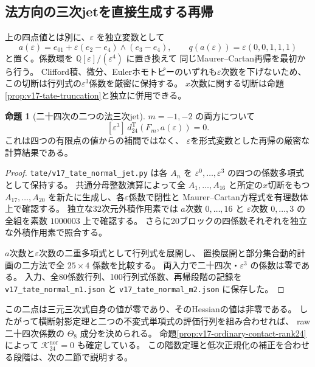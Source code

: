 \documentclass[a4paper,11pt]{ltjsarticle}
\theoremstyle{definition}
\newtheorem{proposition}[theorem]{命題}
\begin{document}
\subsection{法方向の三次jetを直接生成する再帰}
\label{subsec:v17-tate-normal-jets}
上の四点値とは別に、$\varepsilon$ を独立変数として
\[
 a(\varepsilon)=e_{01}+\varepsilon(e_2-e_4)\wedge(e_3-e_4),
 \qquad q(a(\varepsilon))=\varepsilon(0,0,1,1,1)
\]
と置く。係数環を $\mathbb Q[\varepsilon]/(\varepsilon^4)$ に置き換えて
同じMaurer--Cartan再帰を最初から行う。
Clifford積、微分、Eulerホモトピーのいずれも$\varepsilon$次数を下げないため、
この切断は行列式の$\varepsilon^3$係数を厳密に保持する。
$x$次数に関する切断は命題\ref{prop:v17-tate-truncation}と独立に併用できる。

\begin{proposition}[二十四次の二つの法三次jet]
\label{prop:v17-tate24-normal-jets}
$m=-1,-2$ の両方について
\[
 [\varepsilon^3]\,d_{24}^{\mathrm T}(F_m,a(\varepsilon))=0.
\]
これは四つの有限点の値からの補間ではなく、
$\varepsilon$を形式変数とした再帰の厳密な計算結果である。
\end{proposition}
\begin{proof}
\nolinkurl{tate/v17_tate_normal_jet.py} は各 $A_n$ を
$\varepsilon^0,\ldots,\varepsilon^3$ の四つの係数多項式として保持する。
共通分母整数演算によって全 $A_1,\ldots,A_{16}$ と所定の$x$切断をもつ
$A_{17},\ldots,A_{20}$ を新たに生成し、各$\varepsilon$係数で閉性と
Maurer--Cartan方程式を有理数体上で確認する。
独立な32次元外積作用素では $a$次数 $0,\ldots,16$ と
$\varepsilon$次数 $0,\ldots,3$ の全組を素数 $1000003$ 上で確認する。
さらに20ブロックの四係数それぞれを独立な外積作用素で照合する。

$a$次数と$\varepsilon$次数の二重多項式として行列式を展開し、
置換展開と部分集合動的計画の二方法で全 $25\times4$ 係数を比較する。
両入力で二十四次・$\varepsilon^3$ の係数は零である。
入力、全80係数行列、100行列式係数、再帰段階の記録を
\nolinkurl{v17_tate_normal_m1.json} と
\nolinkurl{v17_tate_normal_m2.json} に保存した。
\end{proof}

この二点は三元三次式自身の値が零であり、そのHessianの値は非零である。
したがって横断射影定理と二つの不変式単項式の評価行列を組み合わせれば、
raw二十四次係数の $\Theta_8$ 成分を決められる。
命題\ref{prop:v17-ordinary-contact-rank24}によって
$\mathcal K_{24}^{\mathrm{nor}}=0$ も確定している。
この階数定理と低次正規化の補正を合わせる段階は、次の二節で説明する。

\end{document}
